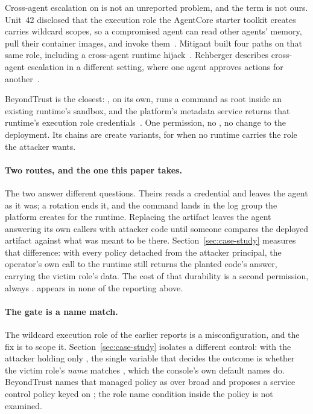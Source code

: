 Cross-agent escalation on \agentcore is not an unreported problem, and the
term is not ours. Unit~42 disclosed that the execution role the AgentCore
starter toolkit creates carries wildcard scopes, so a compromised agent can
read other agents' memory, pull their container images, and invoke
them~\cite{hadad2026godmode}. Mitigant built four paths on that same role,
including a cross-agent runtime hijack~\cite{torkura2026agentsore}. Rehberger describes cross-agent escalation
in a different setting, where one agent approves actions for
another~\cite{rehberger2025freeeachother}.

BeyondTrust is the closest: , on
its own, runs a
command as root inside an existing runtime's sandbox, and the platform's
metadata service returns that runtime's execution role
credentials~\cite{garcia2026agentcorepaths}. One permission, no
, no change to the deployment. Its  chains
are create variants, for when no runtime carries the role the attacker wants.

\paragraph{Two routes, and the one this paper takes.}
The two answer different questions. Theirs reads a credential and leaves the
agent as it was; a rotation ends it, and the command lands in the log group
the platform creates for the runtime. Replacing the artifact leaves the agent
answering its own callers with attacker code until someone compares the
deployed artifact against what was meant to be there. Section~\ref{sec:case-study}
measures that difference: with every policy detached from the attacker
principal, the operator's own call to the runtime still returns the planted
code's answer, carrying the victim role's data. The cost of that durability is
a second permission, always .
 appears in none of the reporting above.

\paragraph{The gate is a name match.}
The wildcard execution role of the earlier reports is a misconfiguration, and
the fix is to scope it. Section~\ref{sec:case-study} isolates a different
control: with the attacker holding only , the
single variable that decides the outcome is whether the victim role's
\emph{name} matches , which the console's own default
names do. BeyondTrust names that managed policy as over broad and proposes a
service control policy keyed on ; the role name
condition inside the policy is not examined.


